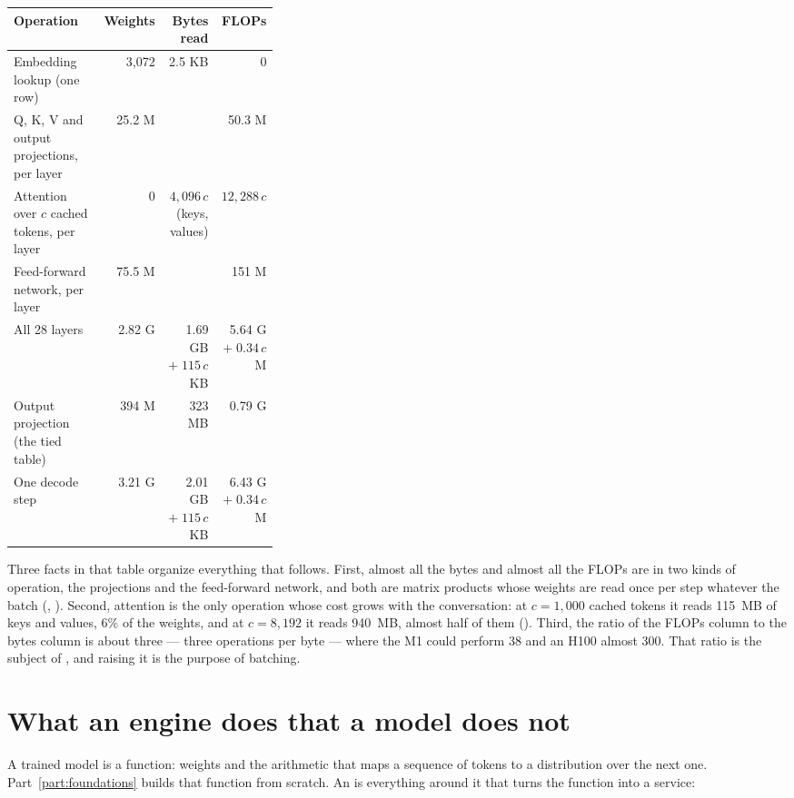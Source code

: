 \begin{center}\small
\begin{tabular}{@{}>{\raggedright\arraybackslash}p{0.34\linewidth}rrr@{}}
\toprule
Operation & Weights & Bytes read & FLOPs \\
\midrule
Embedding lookup (one row) & 3,072 & 2.5 KB & 0 \\
Q, K, V and output projections, per layer & 25.2 M & & 50.3 M \\
Attention over $c$ cached tokens, per layer & 0 & $4{,}096\,c$ (keys, values) & $12{,}288\,c$ \\
Feed-forward network, per layer & 75.5 M & & 151 M \\
All 28 layers & 2.82 G & 1.69 GB $+ \; 115\,c$ KB & 5.64 G $+ \; 0.34\,c$ M \\
Output projection (the tied table) & 394 M & 323 MB & 0.79 G \\
\midrule
One decode step & 3.21 G & 2.01 GB $+ \; 115\,c$ KB & 6.43 G $+ \; 0.34\,c$ M \\
\bottomrule
\end{tabular}
\end{center}

\noindent Three facts in that table organize everything that follows. First,
almost all the bytes and almost all the FLOPs are in two kinds of operation, the
projections and the feed-forward network, and both are matrix products whose
weights are read once per step whatever the batch (,
). Second, attention is the only operation whose cost
grows with the conversation: at $c = 1{,}000$ cached tokens it reads 115~MB of
keys and values, 6\% of the weights, and at $c = 8{,}192$ it reads 940~MB, almost
half of them (). Third, the ratio of the FLOPs column to the bytes
column is about three --- three operations per byte --- where the M1 could
perform 38 and an H100 almost 300. That ratio is the subject of ,
and raising it is the purpose of batching.

\section{What an engine does that a model does not}

A trained model is a function: weights and the arithmetic that maps a sequence
of tokens to a distribution over the next one. Part~\ref{part:foundations}
builds that function from scratch. An  is everything
around it that turns the function into a service:

